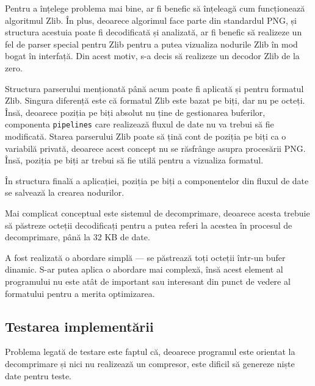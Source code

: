 \documentclass[a4paper,12pt]{report}
\begin{document}
Pentru a înțelege problema mai bine, ar fi benefic să înțeleagă cum funcționează algoritmul Zlib.
În plus, deoarece algorimul face parte din standardul \ac{PNG},
și structura acestuia poate fi decodificată și analizată,
ar fi benefic să realizeze un fel de parser special pentru Zlib pentru a putea vizualiza nodurile Zlib
în mod bogat în interfață.
Din acest motiv, s-a decis să realizeze un decodor Zlib de la zero.

Structura parserului menționată până acum poate fi aplicată și pentru formatul Zlib.
Singura diferență este că formatul Zlib este bazat pe biți, dar nu pe octeți.
Însă, deoarece poziția pe biți absolut nu ține de gestionarea buferilor,
componenta \texttt{pipelines} care realizează fluxul de date nu va trebui să fie modificată.
Starea parserului Zlib poate să țină cont de poziția pe biți ca o variabilă privată, deoarece
acest concept nu se răsfrânge asupra procesării \ac{PNG}.
Însă, poziția pe biți ar trebui să fie utilă pentru a vizualiza formatul.

În structura finală a aplicației, poziția pe biți a componentelor din fluxul de date se salvează la crearea nodurilor.

Mai complicat conceptual este sistemul de decomprimare,
deoarece acesta trebuie să păstreze octeții decodificați pentru a putea referi la acestea
în procesul de decomprimare, până la 32 KB de date.

A fost realizată o abordare simplă --- se păstrează toți octeții într-un bufer dinamic.
S-ar putea aplica o abordare mai complexă, însă acest element al programului
nu este atât de important sau interesant din punct de vedere al formatului pentru a merita optimizarea.

\subsection{Testarea implementării}

Problema legată de testare este faptul că, deoarece programul este orientat
la decomprimare și nici nu realizează un compresor,
este dificil să genereze niște date pentru teste.
\end{document}
